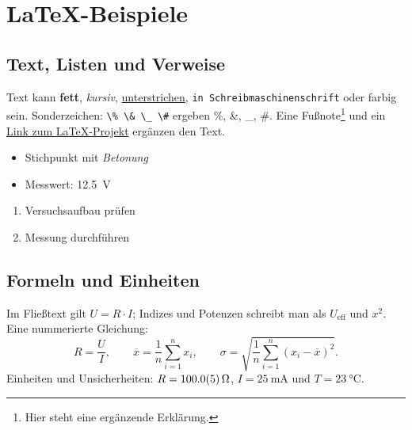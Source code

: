 \section{LaTeX-Beispiele}
\label{sec:beispiele}
\begingroup
\small

\subsection{Text, Listen und Verweise}
Text kann \textbf{fett}, \textit{kursiv}, \underline{unterstrichen},
\texttt{in Schreibmaschinenschrift} oder \textcolor{Akzent}{farbig} sein.
Sonderzeichen: \verb|\% \& \_ \#| ergeben \%, \&, \_, \#.
Eine Fußnote\footnote{Hier steht eine ergänzende Erklärung.} und ein
\href{https://www.latex-project.org/}{Link zum LaTeX-Projekt} ergänzen den Text.

\noindent
\begin{minipage}[t]{0.48\linewidth}
  \begin{itemize}
    \setlength{\itemsep}{0pt}
    \setlength{\parskip}{0pt}
    \item Stichpunkt mit \emph{Betonung}
    \item Messwert: \qty{12.5}{\volt}
  \end{itemize}
\end{minipage}\hfill
\begin{minipage}[t]{0.48\linewidth}
  \begin{enumerate}
    \setlength{\itemsep}{0pt}
    \setlength{\parskip}{0pt}
    \item Versuchsaufbau prüfen
    \item Messung durchführen
  \end{enumerate}
\end{minipage}

\subsection{Formeln und Einheiten}
Im Fließtext gilt $U=R\cdot I$; Indizes und Potenzen schreibt man als
$U_{\mathrm{eff}}$ und $x^2$. Eine nummerierte Gleichung:
\begin{equation}
  R=\frac{U}{I},\qquad
  \overline{x}=\frac{1}{n}\sum_{i=1}^{n}x_i,\qquad
  \sigma=\sqrt{\frac{1}{n}\sum_{i=1}^{n}(x_i-\overline{x})^2}.
  \label{eq:auswertung}
\end{equation}
Einheiten und Unsicherheiten: $R=\qty{100.0 +- 0.5}{\ohm}$,
$I=\qty{25}{\milli\ampere}$ und $T=\qty{23}{\degreeCelsius}$.

